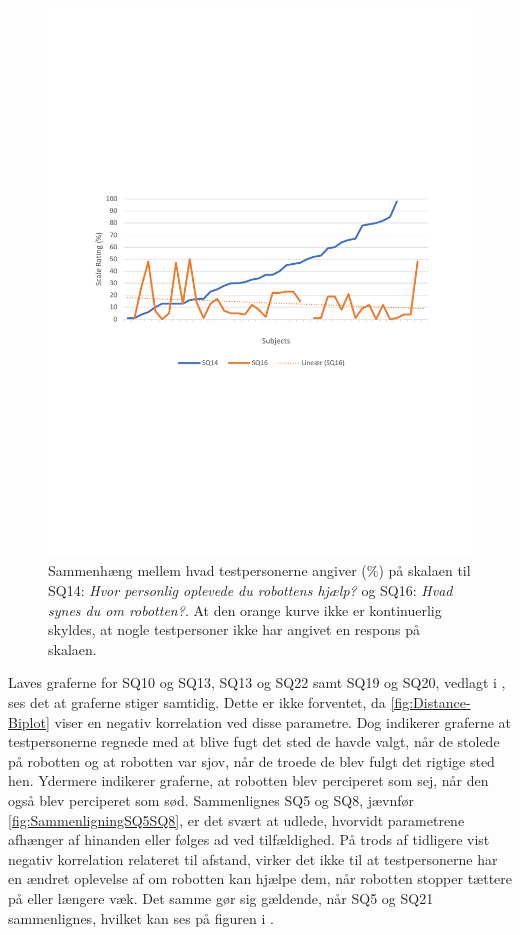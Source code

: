 \begin{figure}[H]
	\centering
	\includegraphics[width=\textwidth]{Figure/Korrelationsgrafer/SQ14+SQ16}
	\caption{Sammenhæng mellem hvad testpersonerne angiver (\%) på skalaen til SQ14: \textit{Hvor personlig oplevede du robottens hjælp?} og SQ16: \textit{Hvad synes du om robotten?}. At den orange kurve ikke er kontinuerlig skyldes, at nogle testpersoner ikke har angivet en respons på skalaen.}
	\label{fig:SammenligningSQ14SQ16}
\end{figure}
\noindent
%
Laves graferne for SQ10 og SQ13, SQ13 og SQ22 samt SQ19 og SQ20, vedlagt i , ses det at graferne stiger samtidig. Dette er ikke forventet, da \autoref{fig:Distance-Biplot} viser en negativ korrelation ved disse parametre. Dog indikerer graferne at testpersonerne regnede med at blive fugt det sted de havde valgt, når de stolede på robotten og at robotten var sjov, når de troede de blev fulgt det rigtige sted hen. Ydermere indikerer graferne, at robotten blev perciperet som sej, når den også blev perciperet som sød.
Sammenlignes SQ5 og SQ8, jævnfør \autoref{fig:SammenligningSQ5SQ8}, er det svært at udlede, hvorvidt parametrene afhænger af hinanden eller følges ad ved tilfældighed. På trods af tidligere vist negativ korrelation relateret til afstand, virker det ikke til at testpersonerne har en ændret oplevelse af om robotten kan hjælpe dem, når robotten stopper tættere på eller længere væk. Det samme gør sig gældende, når SQ5 og SQ21 sammenlignes, hvilket kan ses på figuren i . 

